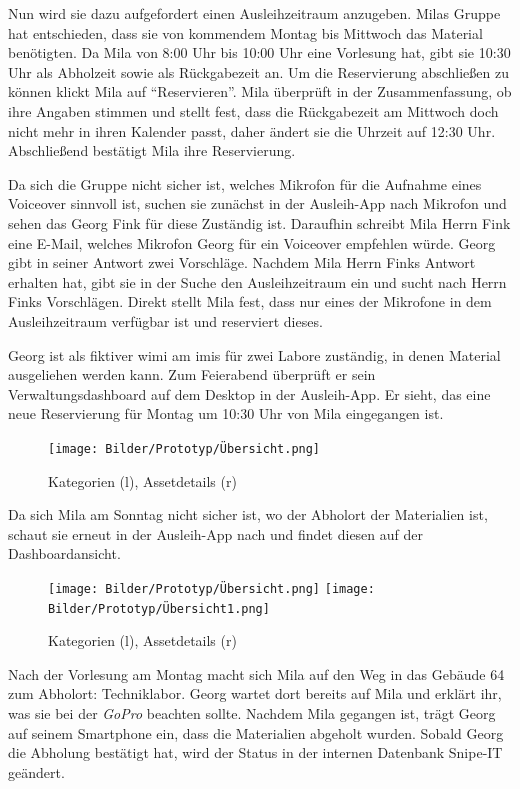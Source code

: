 Nun wird sie dazu aufgefordert einen Ausleihzeitraum anzugeben. Milas Gruppe hat entschieden, dass
sie von kommendem Montag bis Mittwoch das Material benötigten. Da Mila von 8:00 Uhr bis 10:00 Uhr
eine Vorlesung hat, gibt sie 10:30 Uhr als Abholzeit sowie als Rückgabezeit an. Um die Reservierung
abschließen zu können klickt Mila auf \enquote{Reservieren}. Mila überprüft in der Zusammenfassung,
ob ihre Angaben stimmen und stellt fest, dass die Rückgabezeit am Mittwoch doch nicht mehr in ihren
Kalender passt, daher ändert sie die Uhrzeit auf 12:30 Uhr. Abschließend bestätigt Mila ihre
Reservierung. 

Da sich die Gruppe nicht sicher ist, welches Mikrofon für die Aufnahme eines Voiceover sinnvoll ist,
suchen sie zunächst in der Ausleih-App nach Mikrofon und sehen das Georg Fink für diese Zuständig ist.
Daraufhin schreibt Mila Herrn Fink eine E-Mail, welches Mikrofon Georg für ein Voiceover empfehlen würde.
Georg gibt in seiner Antwort zwei Vorschläge. Nachdem Mila Herrn Finks Antwort erhalten hat, gibt sie in
der Suche den Ausleihzeitraum ein und sucht nach Herrn Finks Vorschlägen. Direkt stellt Mila fest, dass nur
eines der Mikrofone in dem Ausleihzeitraum verfügbar ist und reserviert dieses. 

Georg ist als fiktiver \ac{wimi} am \ac{imis} für zwei Labore zuständig, in denen Material
ausgeliehen werden kann. Zum Feierabend überprüft er sein Verwaltungsdashboard auf dem Desktop in
der Ausleih-App. Er sieht, das eine neue Reservierung für Montag um 10:30 Uhr von Mila eingegangen
ist. 

\begin{figure}[h]
    \centering
    \texttt{[image: Bilder/Prototyp/Übersicht.png]}
    \label{fig:p4}
    \caption[Mockup: Kategorien, Assets, Assetdetails]{Kategorien (l), Assetdetails (r)}
\end{figure}

Da sich Mila am Sonntag nicht sicher ist, wo der Abholort der Materialien ist, schaut sie
erneut in der Ausleih-App nach und findet diesen auf der Dashboardansicht.

\begin{figure}[h]
    \centering
    \texttt{[image: Bilder/Prototyp/Übersicht.png]}\hspace{2em}
    \texttt{[image: Bilder/Prototyp/Übersicht1.png]}
    \label{fig:p4}
    \caption[Mockup: Kategorien, Assets, Assetdetails]{Kategorien (l), Assetdetails (r)}
\end{figure}

Nach der Vorlesung am Montag macht sich Mila auf den Weg in das Gebäude 64 zum Abholort: Techniklabor.
Georg wartet dort bereits auf Mila und erklärt ihr, was sie bei der \textit{GoPro} beachten sollte. 
Nachdem Mila gegangen ist, trägt Georg auf seinem Smartphone ein, dass die Materialien abgeholt wurden.
Sobald Georg die Abholung bestätigt hat, wird der Status in der internen Datenbank Snipe-IT
geändert.


